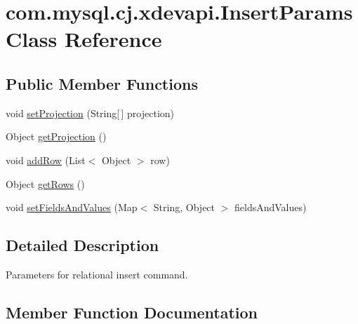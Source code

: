 \hypertarget{classcom_1_1mysql_1_1cj_1_1xdevapi_1_1_insert_params}{}\section{com.\+mysql.\+cj.\+xdevapi.\+Insert\+Params Class Reference}
\label{classcom_1_1mysql_1_1cj_1_1xdevapi_1_1_insert_params}
\subsection*{Public Member Functions}
\begin{DoxyCompactItemize}
\item 
void \mbox{\hyperlink{classcom_1_1mysql_1_1cj_1_1xdevapi_1_1_insert_params_a24fc565a32e226e50102e0acceaedad1}{set\+Projection}} (String\mbox{[}$\,$\mbox{]} projection)
\item 
Object \mbox{\hyperlink{classcom_1_1mysql_1_1cj_1_1xdevapi_1_1_insert_params_a3f31119dfb7d04ca211c9061da25c048}{get\+Projection}} ()
\item 
void \mbox{\hyperlink{classcom_1_1mysql_1_1cj_1_1xdevapi_1_1_insert_params_adc7aa4d7c347cfdee2f2bb4d8d7efdec}{add\+Row}} (List$<$ Object $>$ row)
\item 
Object \mbox{\hyperlink{classcom_1_1mysql_1_1cj_1_1xdevapi_1_1_insert_params_a920e6a772e6d424caa6174bf249dba13}{get\+Rows}} ()
\item 
void \mbox{\hyperlink{classcom_1_1mysql_1_1cj_1_1xdevapi_1_1_insert_params_a439b23f0d008f44cbd1c50bba01f707c}{set\+Fields\+And\+Values}} (Map$<$ String, Object $>$ fields\+And\+Values)
\end{DoxyCompactItemize}


\subsection{Detailed Description}
Parameters for relational insert command. 

\subsection{Member Function Documentation}
\mbox{\label{classcom_1_1mysql_1_1cj_1_1xdevapi_1_1_insert_params_adc7aa4d7c347cfdee2f2bb4d8d7efdec}} 
